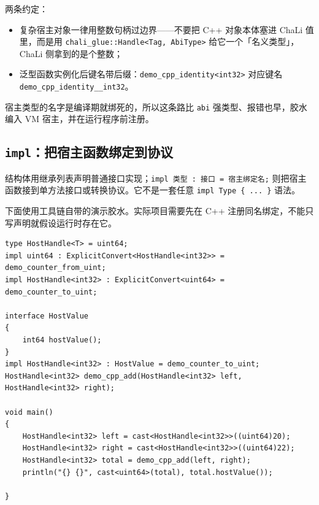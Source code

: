 两条约定：

\begin{itemize}

\item 复杂宿主对象一律用整数句柄过边界——不要把 C++ 对象本体塞进 ChaLi 值里，而是用 \texttt{chali\_glue:\allowbreak{}:\allowbreak{}Handle<\allowbreak{}Tag,\allowbreak{} Abi\allowbreak{}Type>\allowbreak{}} 给它一个「名义类型」，ChaLi 侧拿到的是个整数；

\item 泛型函数实例化后键名带后缀：\texttt{demo\_cpp\_identity<\allowbreak{}int32>\allowbreak{}} 对应键名\texttt{demo\_cpp\_identity\_\_int32}。

\end{itemize}

宿主类型的名字是编译期就绑死的，所以这条路比 \texttt{abi} 强类型、报错也早，胶水编入 VM 宿主，并在运行程序前注册。

\subsection*{\texttt{impl}：把宿主函数绑定到协议}

结构体用继承列表声明普通接口实现；\texttt{impl 类型 :\allowbreak{} 接口 =\allowbreak{} 宿主绑定名;} 则把宿主函数接到单方法接口或转换协议。它不是一套任意 \texttt{impl Type \{ .\allowbreak{}.\allowbreak{}.\allowbreak{} \}} 语法。

下面使用工具链自带的演示胶水。实际项目需要先在 C++ 注册同名绑定，不能只写声明就假设运行时存在它。

\par
\medskip
\begin{lstlisting}[style=chali]
type HostHandle<T> = uint64;
impl uint64 : ExplicitConvert<HostHandle<int32>> = demo_counter_from_uint;
impl HostHandle<int32> : ExplicitConvert<uint64> = demo_counter_to_uint;

interface HostValue
{
    int64 hostValue();
}
impl HostHandle<int32> : HostValue = demo_counter_to_uint;
HostHandle<int32> demo_cpp_add(HostHandle<int32> left, HostHandle<int32> right);

void main()
{
    HostHandle<int32> left = cast<HostHandle<int32>>((uint64)20);
    HostHandle<int32> right = cast<HostHandle<int32>>((uint64)22);
    HostHandle<int32> total = demo_cpp_add(left, right);
    println("{} {}", cast<uint64>(total), total.hostValue());

}
\end{lstlisting}
\par
\medskip


